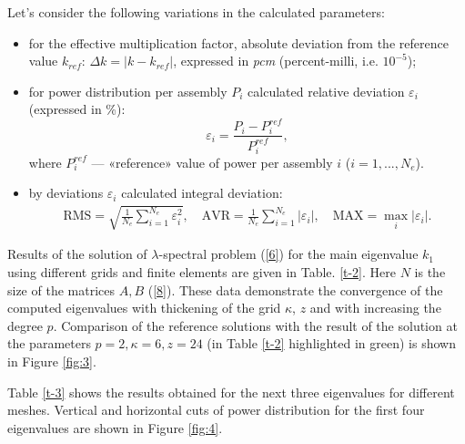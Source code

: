 \documentclass[runningheads,a4paper]{llncs}
\begin{document}

Let's consider the following variations in the calculated parameters:
\begin{itemize}\itemsep1pt \parskip0pt 
\item for the effective multiplication factor, absolute deviation from the reference value $k_{ref}$: $\Delta k = |k - k_{ref}|$, expressed in \textit{pcm} (percent-milli, i.e. $10^{-5}$);
\item for power distribution per assembly $P_i$ calculated relative deviation $\varepsilon_i$ (expressed in \%):
\[
\varepsilon_i = \frac{P_i - P_i^{ref}}{P_i^{ref}},
\]
where $P_i^{ref}$ --- «reference» value of power per assembly $i$ ($i = 1,...,N_e$).
\item by deviations $\varepsilon_i$ calculated integral deviation:
\[
\begin{split}
\mathrm{RMS} = \sqrt{\frac{1}{N_e}\sum_{i=1}^{N_e} \varepsilon_i^2}, \quad
\mathrm{AVR} = \frac{1}{N_e}\sum_{i=1}^{N_e} \left\vert \varepsilon_i\right\vert, \quad
\mathrm{MAX} = \underset{i}{\max}\left\vert\varepsilon_i\right\vert.
\end{split}
\]
\end{itemize}

Results of the solution of $\lambda$-spectral problem (\ref{6}) for the main eigenvalue $k_1 $ using different grids and finite elements are given in Table. \ref{t-2}. Here $N$ is  the size of the matrices $A,B$ (\ref{8}). These data demonstrate the convergence of the computed eigenvalues with thickening of the grid $\kappa$, $z$ and with increasing the degree $p$. Comparison of the reference solutions with the result of the solution at the parameters $p=2, \kappa=6, z=24$ (in Table \ref{t-2} highlighted in green) is shown in Figure \ref{fig:3}.


Table \ref{t-3} shows the results obtained for the next three eigenvalues for different meshes.
Vertical and horizontal cuts of power distribution for the first four eigenvalues are shown in Figure \ref{fig:4}.
\end{document}
